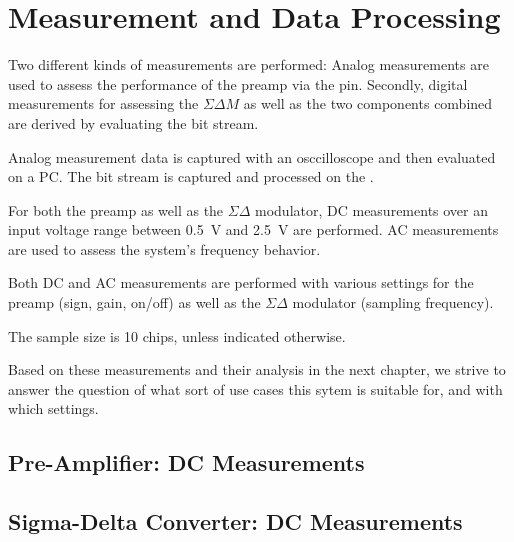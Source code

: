 \chapter{Measurement and Data Processing}
\label{chap:measurementProcess}


Two different  kinds of measurements  are performed:  Analog  measurements are
used  to assess  the  performance  of the  preamp  via  the 
pin. Secondly, digital measurements for assessing the $\Sigma\Delta M$ as well
as the two components combined are derived by evaluating the bit stream.

Analog measurement data  is captured with an osccilloscope  and then evaluated
on a PC. The bit stream is captured and processed on the \raspi.

For both the  preamp as well as the $\Sigma\Delta$  modulator, DC measurements
over an input  voltage range between \SI{0.5}{\volt}  and  \SI{2.5}{\volt} are
performed. AC measurements are used to assess the system's frequency behavior.

Both DC and AC measurements are performed with various settings for the preamp
(sign,  gain,  on/off)  as  well as  the  $\Sigma\Delta$  modulator  (sampling
frequency).

The sample size is 10 chips, unless indicated otherwise.

Based on these measurements and their  analysis in the next chapter, we strive
to answer the question  of what sort of use cases this  sytem is suitable for,
and with which settings.



\section{Pre-Amplifier: DC Measurements}
\label{sec:preAmpDC}

\section{Sigma-Delta Converter: DC Measurements}
\label{sec:sigdelDC}

